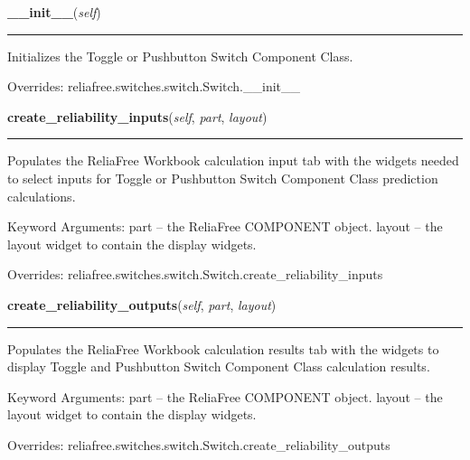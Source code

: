\hspace{.8\funcindent}\begin{boxedminipage}{\funcwidth}

    \raggedright \textbf{\_\_init\_\_}(\textit{self})

    \vspace{-1.5ex}

    \rule{\textwidth}{0.5\fboxrule}
\setlength{\parskip}{2ex}
    Initializes the Toggle or Pushbutton Switch Component Class.

\setlength{\parskip}{1ex}
      Overrides: reliafree.switches.switch.Switch.\_\_init\_\_

    \end{boxedminipage}

    \vspace{0.5ex}

\hspace{.8\funcindent}\begin{boxedminipage}{\funcwidth}

    \raggedright \textbf{create\_reliability\_inputs}(\textit{self}, \textit{part}, \textit{layout})

    \vspace{-1.5ex}

    \rule{\textwidth}{0.5\fboxrule}
\setlength{\parskip}{2ex}
    Populates the ReliaFree Workbook calculation input tab with the widgets
    needed to select inputs for Toggle or Pushbutton Switch Component Class
    prediction calculations.

    Keyword Arguments: part   -- the ReliaFree COMPONENT object. layout -- 
    the layout widget to contain the display widgets.

\setlength{\parskip}{1ex}
      Overrides: reliafree.switches.switch.Switch.create\_reliability\_inputs

    \end{boxedminipage}

    \vspace{0.5ex}

\hspace{.8\funcindent}\begin{boxedminipage}{\funcwidth}

    \raggedright \textbf{create\_reliability\_outputs}(\textit{self}, \textit{part}, \textit{layout})

    \vspace{-1.5ex}

    \rule{\textwidth}{0.5\fboxrule}
\setlength{\parskip}{2ex}
    Populates the ReliaFree Workbook calculation results tab with the 
    widgets to display Toggle and Pushbutton Switch Component Class 
    calculation results.

    Keyword Arguments: part   -- the ReliaFree COMPONENT object. layout -- 
    the layout widget to contain the display widgets.

\setlength{\parskip}{1ex}
      Overrides: reliafree.switches.switch.Switch.create\_reliability\_outputs

    \end{boxedminipage}

